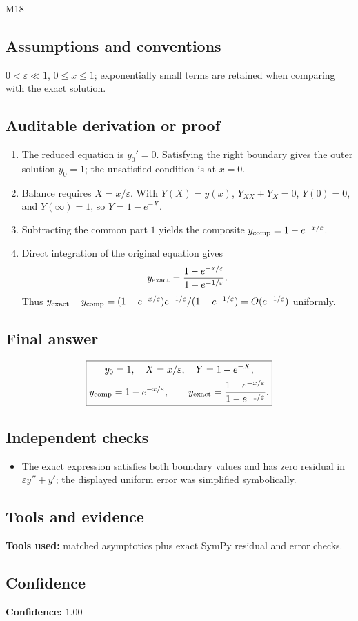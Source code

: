 \documentclass[11pt]{article}
\begin{document}
\begin{mprsolution}{M18}
\subsection*{Assumptions and conventions}
\(0<\varepsilon\ll1\), \(0\le x\le1\); exponentially small terms are retained
when comparing with the exact solution.
\subsection*{Auditable derivation or proof}
\begin{enumerate}[label=\textbf{Step \arabic*:},leftmargin=*]
\item The reduced equation is \(y_0'=0\).  Satisfying the right boundary gives
the outer solution \(y_0=1\); the unsatisfied condition is at \(x=0\).
\item Balance requires \(X=x/\varepsilon\).  With \(Y(X)=y(x)\),
\(Y_{XX}+Y_X=0\), \(Y(0)=0\), and \(Y(\infty)=1\), so
\(Y=1-e^{-X}\).
\item Subtracting the common part \(1\) yields the composite
\(y_{\rm comp}=1-e^{-x/\varepsilon}\).
\item Direct integration of the original equation gives
\[
y_{\rm exact}=\frac{1-e^{-x/\varepsilon}}{1-e^{-1/\varepsilon}}.
\]
Thus \(y_{\rm exact}-y_{\rm comp}=
(1-e^{-x/\varepsilon})e^{-1/\varepsilon}/(1-e^{-1/\varepsilon})
=O(e^{-1/\varepsilon})\) uniformly.
\end{enumerate}
\subsection*{Final answer}
\[
\boxed{\begin{gathered}
y_0=1,\quad X=x/\varepsilon,\quad Y=1-e^{-X},\\
y_{\rm comp}=1-e^{-x/\varepsilon},\qquad
y_{\rm exact}=\dfrac{1-e^{-x/\varepsilon}}{1-e^{-1/\varepsilon}}.
\end{gathered}}
\]
\subsection*{Independent checks}
\begin{itemize}[leftmargin=*]
\item The exact expression satisfies both boundary values and has zero
residual in \(\varepsilon y''+y'\); the displayed uniform error was simplified
symbolically.
\end{itemize}
\subsection*{Tools and evidence}
\textbf{Tools used:} matched asymptotics plus exact SymPy residual and error
checks.
\subsection*{Confidence}
\textbf{Confidence:} \(1.00\)
\end{mprsolution}
\end{document}
